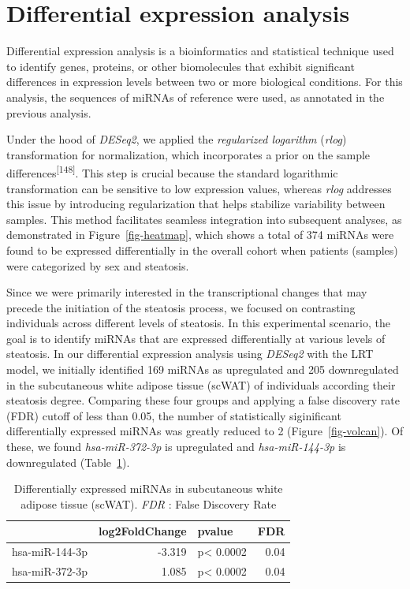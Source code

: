 \documentclass[
  11pt,
  letterpaper,
]{book}
\begin{document}
\section{Differential expression
analysis}\label{differential-expression-analysis}

Differential expression analysis is a bioinformatics and statistical
technique used to identify genes, proteins, or other biomolecules that
exhibit significant differences in expression levels between two or more
biological conditions. For this analysis, the sequences of miRNAs of
reference were used, as annotated in the previous analysis.

Under the hood of \emph{DESeq2}, we applied the \emph{regularized
logarithm} (\emph{rlog}) transformation for normalization, which
incorporates a prior on the sample
differences\textsuperscript{{[}148{]}}. This step is crucial because the
standard logarithmic transformation can be sensitive to low expression
values, whereas \emph{rlog} addresses this issue by introducing
regularization that helps stabilize variability between samples. This
method facilitates seamless integration into subsequent analyses, as
demonstrated in Figure~\ref{fig-heatmap}, which shows a total of 374
miRNAs were found to be expressed differentially in the overall cohort
when patients (samples) were categorized by sex and steatosis.

Since we were primarily interested in the transcriptional changes that
may precede the initiation of the steatosis process, we focused on
contrasting individuals across different levels of steatosis. In this
experimental scenario, the goal is to identify miRNAs that are expressed
differentially at various levels of steatosis. In our differential
expression analysis using \emph{DESeq2} with the LRT model, we initially
identified 169 miRNAs as upregulated and 205 downregulated in the
subcutaneous white adipose tissue (scWAT) of individuals according their
steatosis degree. Comparing these four groups and applying a false
discovery rate (FDR) cutoff of less than 0.05, the number of
statistically siginificant differentially expressed miRNAs was greatly
reduced to 2 (Figure~\ref{fig-volcan}). Of these, we found
\emph{hsa-miR-372-3p} is upregulated and \emph{hsa-miR-144-3p} is
downregulated (Table~\ref{tbl-mirnas_selected}).

\begingroup\fontsize{11}{13}\selectfont

\begin{longtable}[t]{lrlr}

\caption{\label{tbl-mirnas_selected}Differentially expressed miRNAs in
subcutaneous white adipose tissue (scWAT). \emph{FDR} : False Discovery
Rate}

\tabularnewline

\toprule
\textbf{} & \textbf{log2FoldChange} & \textbf{pvalue} & \textbf{FDR}\\
\midrule
hsa-miR-144-3p & -3.319 & p< 0.0002 & 0.04\\
hsa-miR-372-3p & 1.085 & p< 0.0002 & 0.04\\
\bottomrule

\end{longtable}
\end{document}
